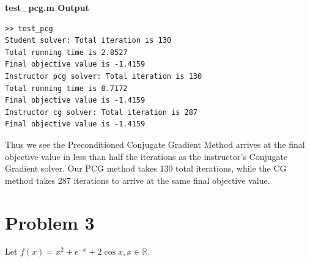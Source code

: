 \documentclass[12pt]{article}
\newcommand{\RR}{\mathbb{R}}
\begin{document}
\noindent \textbf{test\_pcg.m Output}
\begin{verbatim}
>> test_pcg
Student solver: Total iteration is 130
Total running time is 2.8527
Final objective value is -1.4159
Instructor pcg solver: Total iteration is 130
Total running time is 0.7172
Final objective value is -1.4159
Instructor cg solver: Total iteration is 287
Final objective value is -1.4159
\end{verbatim}

\vspace{4mm}

\noindent Thus we see the Preconditioned Conjugate Gradient Method arrives at the final objective value in less than half the iterations as the instructor's Conjugate Gradient solver. Our PCG method takes 130 total iterations, while the CG method takes 287 iterations to arrive at the same final objective value.

\newpage

\section*{Problem 3}
 Let $f(x) = x^2 + e^{-x} +2\cos x, x\in\RR$. 
\end{document}
